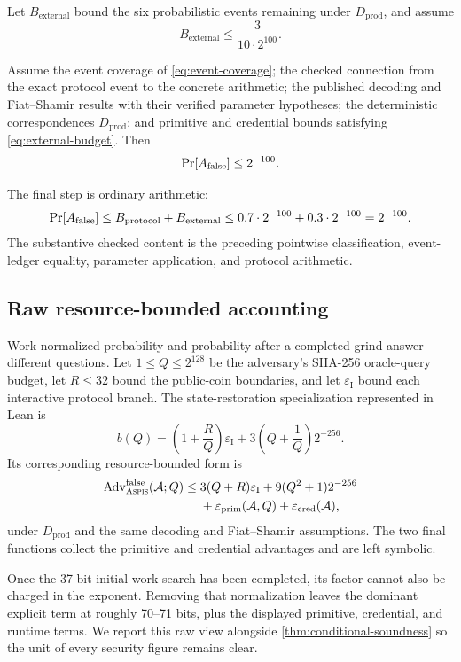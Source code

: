 Let \(B_{\mathrm{external}}\) bound the six probabilistic events remaining
under \(D_{\mathrm{prod}}\), and assume
\begin{equation}
  B_{\mathrm{external}}
  \leq \frac{3}{10\cdot2^{100}}.
  \label{eq:external-budget}
\end{equation}

\begin{theorem}
\label{thm:conditional-soundness}
Assume the event coverage of \cref{eq:event-coverage}; the checked connection
from the exact protocol event to the concrete arithmetic; the published
decoding and Fiat--Shamir results with their verified parameter hypotheses;
the deterministic correspondences \(D_{\mathrm{prod}}\); and primitive and
credential bounds satisfying \cref{eq:external-budget}.  Then
\[
  \Pr[A_{\mathrm{false}}]\leq2^{-100}.
\]
\end{theorem}

The final step is ordinary arithmetic:
\[
  \Pr[A_{\mathrm{false}}]
  \leq B_{\mathrm{protocol}}+B_{\mathrm{external}}
  \leq 0.7\cdot2^{-100}+0.3\cdot2^{-100}
  =2^{-100}.
\]
The substantive checked content is the preceding pointwise classification,
event-ledger equality, parameter application, and protocol arithmetic.

\subsection{Raw resource-bounded accounting}

Work-normalized probability and probability after a completed grind answer
different questions.  Let \(1\leq Q\leq2^{128}\) be the adversary's SHA-256
oracle-query budget, let \(R\leq32\) bound the public-coin boundaries, and let
\(\varepsilon_{\mathrm I}\) bound each interactive protocol branch.  The
state-restoration specialization represented in Lean is
\[
  b(Q)=\left(1+\frac{R}{Q}\right)\varepsilon_{\mathrm I}
       +3\left(Q+\frac1Q\right)2^{-256}.
\]
Its corresponding resource-bounded form is
\begin{align}
  \operatorname{Adv}^{\mathrm{false}}_{\textsc{Aspis}}(\mathcal A;Q)
  \leq {}&3(Q+R)\varepsilon_{\mathrm I}
       +9(Q^2+1)2^{-256} \notag\\
       &+\varepsilon_{\mathrm{prim}}(\mathcal A,Q)
       +\varepsilon_{\mathrm{cred}}(\mathcal A),
  \label{eq:resource-bounded-advantage}
\end{align}
under \(D_{\mathrm{prod}}\) and the same decoding and Fiat--Shamir
assumptions.  The two final functions collect the primitive and credential
advantages and are left symbolic.

Once the 37-bit initial work search has been completed, its factor cannot also
be charged in the exponent.  Removing that normalization leaves the dominant
explicit term at roughly 70--71 bits, plus the displayed primitive,
credential, and runtime terms.  We report this raw view alongside
\cref{thm:conditional-soundness} so the unit of every security figure remains
clear.
